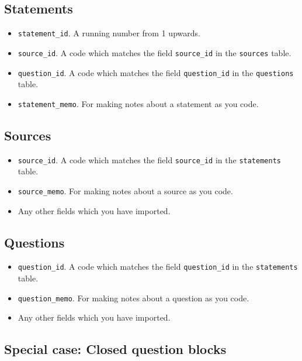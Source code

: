 \documentclass[
]{book}
\providecommand{\tightlist}{%
  \setlength{\itemsep}{0pt}\setlength{\parskip}{0pt}}
\begin{document}
\hypertarget{statements}{%
\subsection{Statements}\label{statements}}

\begin{itemize}
\tightlist
\item
  \texttt{statement\_id}. A running number from 1 upwards.
\item
  \texttt{source\_id}. A code which matches the field \texttt{source\_id} in the \texttt{sources} table.
\item
  \texttt{question\_id}. A code which matches the field \texttt{question\_id} in the \texttt{questions} table.
\item
  \texttt{statement\_memo}. For making notes about a statement as you code.
\end{itemize}

\hypertarget{sources}{%
\subsection{Sources}\label{sources}}

\begin{itemize}
\tightlist
\item
  \texttt{source\_id}. A code which matches the field \texttt{source\_id} in the \texttt{statements} table.
\item
  \texttt{source\_memo}. For making notes about a source as you code.
\item
  Any other fields which you have imported.
\end{itemize}

\hypertarget{questions}{%
\subsection{Questions}\label{questions}}

\begin{itemize}
\tightlist
\item
  \texttt{question\_id}. A code which matches the field \texttt{question\_id} in the \texttt{statements} table.
\item
  \texttt{question\_memo}. For making notes about a question as you code.
\item
  Any other fields which you have imported.
\end{itemize}

\hypertarget{special-case-closed-question-blocks}{%
\subsection{Special case: Closed question blocks}\label{special-case-closed-question-blocks}}
\end{document}
